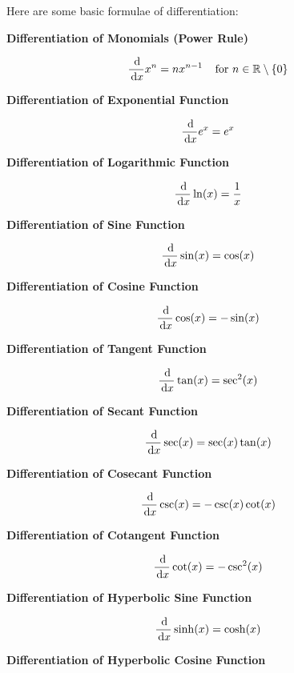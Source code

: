 \documentclass[a4paper,12pt]{article}
\begin{document}
\begin{pst}
  Here are some basic formulae of differentiation:

  \begin{alist}
    \item \textbf{Differentiation of Monomials (Power Rule)}

    $$\frac{\,\mathrm{d}}{\,\mathrm{d} x}x^{n}=nx^{n-1}\;\;\;\;\text{for }n\in\mathbb{R}\setminus\left\{ 0\right\}$$

    \item \textbf{Differentiation of Exponential Function}

    $$\frac{\,\mathrm{d}}{\,\mathrm{d} x}e^{x}=e^{x}$$

    \item \textbf{Differentiation of Logarithmic Function}

    $$\frac{\,\mathrm{d}}{\,\mathrm{d} x}\ln(x)=\frac{1}{x}$$

    \item \textbf{Differentiation of Sine Function}

    $$\frac{\,\mathrm{d}}{\,\mathrm{d} x}\sin(x)=\cos(x)$$

    \item \textbf{Differentiation of Cosine Function}

    $$\frac{\,\mathrm{d}}{\,\mathrm{d} x}\cos(x)=-\sin(x)$$

    \item \textbf{Differentiation of Tangent Function}

    $$\frac{\,\mathrm{d}}{\,\mathrm{d} x}\tan(x)=\sec^{2}(x)$$

    \item \textbf{Differentiation of Secant Function}

    $$\frac{\,\mathrm{d}}{\,\mathrm{d} x}\sec(x)=\sec(x)\tan(x)$$

    \item \textbf{Differentiation of Cosecant Function}

    $$\frac{\,\mathrm{d}}{\,\mathrm{d} x}\csc(x)=-\csc(x)\cot(x)$$

    \item \textbf{Differentiation of Cotangent Function}

    $$\frac{\,\mathrm{d}}{\,\mathrm{d} x}\cot(x)=-\csc^{2}(x)$$

    \item \textbf{Differentiation of Hyperbolic Sine Function}

    $$\frac{\,\mathrm{d}}{\,\mathrm{d} x}\sinh(x)=\cosh(x)$$

    \item \textbf{Differentiation of Hyperbolic Cosine Function}


\end{alist}
\end{pst}
\end{document}
